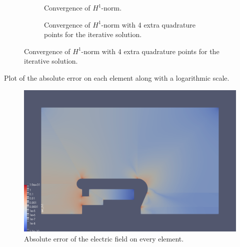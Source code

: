 \begin{figure}[H]
  \begin{center}
    \begin{subfigure}{0.4\textwidth}
      
      \caption{Convergence of $H^1$-norm.}
      \label{fig:convergence_gradient}
    \end{subfigure}
    \qquad \qquad
    \begin{subfigure}{0.4\textwidth}
      
      \caption{Convergence of $H^1$-norm with 4 extra quadrature points for the iterative solution.}
      \label{fig:convergence_gradient_offset}
    \end{subfigure}
  \end{center}
\end{figure}


Plot of the absolute error on each element along with a logarithmic scale.

\begin{center}
\begin{figure}[H]
  \includegraphics[width=\textwidth]{figures/insulator/error_elem}
  \caption{Absolute error of the electric field on every element.}
  \label{fig:error_elem_nsub=1}
\end{figure}
\end{center}

%   
